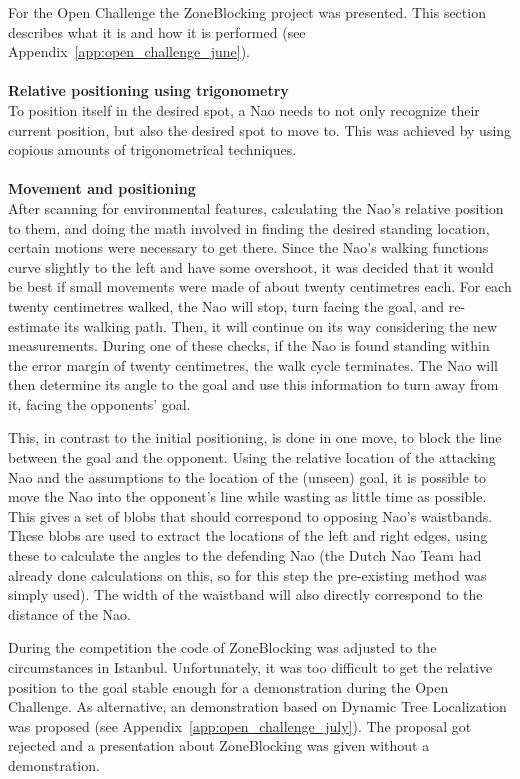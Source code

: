 \documentclass[11pt,a4paper,oneside]{article}
\begin{document}
For the Open Challenge the ZoneBlocking project was presented. This section describes what it is and how it is performed (see Appendix~\ref{app:open_challenge_june}).\\\\
{\bf Relative positioning using trigonometry}\\
To position itself in the desired spot, a Nao needs to not only recognize their current position, but also the desired spot to move to. This was achieved by using copious amounts of trigonometrical techniques.\\\\
{\bf Movement and positioning}\\
After scanning for environmental features, calculating the Nao's relative position to them, and doing the math involved in finding the desired standing location, certain motions were necessary to get there. Since the Nao's walking functions curve slightly to the left and have some overshoot, it was decided that it would be best if small movements were made of about twenty centimetres each. For each twenty centimetres walked, the Nao will stop, turn facing the goal, and re-estimate its walking path. Then, it will continue on its way considering the new measurements. During one of these checks, if the Nao is found standing within the error margin of twenty centimetres, the walk cycle terminates. The Nao will then determine its angle to the goal and use this information to turn away from it, facing the opponents' goal.

This, in contrast to the initial positioning, is done in one move, to block the line between the goal and the opponent. Using the relative location of the attacking Nao and the assumptions to the location of the (unseen) goal, it is possible to move the Nao into the opponent's line while wasting as little time as possible. This gives a set of blobs that should correspond to opposing Nao’s waistbands. These blobs are used to extract the locations of the left and right edges, using these to calculate the angles to the defending Nao (the Dutch Nao Team had already done calculations on this, so for this step the pre-existing method was simply used). The width of the waistband will also directly correspond to the distance of the Nao. 

During the competition the code of ZoneBlocking was adjusted to the circumstances in Istanbul. Unfortunately, it was too difficult to get the relative position to the goal stable enough for a demonstration during the Open Challenge. As alternative, an demonstration based on Dynamic Tree Localization was proposed (see Appendix~\ref{app:open_challenge_july}). The proposal got rejected and a presentation about ZoneBlocking was given without a demonstration.
\end{document}
